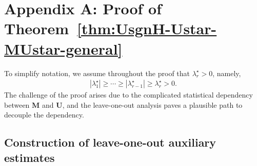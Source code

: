 
















\section{Appendix A: Proof of Theorem~\ref{thm:UsgnH-Ustar-MUstar-general}}
\label{sec:proof-thm:UsgnH-Ustar-MUstar-general}

To simplify notation, we assume throughout the proof that $\lambda_r^{\star} > 0$, namely,
%
\begin{align}
	|\lambda_1^{\star}| \geq  \cdots \geq | \lambda_{r-1}^{\star} | \geq \lambda_r^{\star} > 0.
	\label{eq:assumption-lambda-r-positive}
\end{align}
The challenge of the proof arises due to the complicated statistical dependency between $\bm{M}$ and $\bm{U}$, and the leave-one-out analysis paves a plausible path to decouple the dependency.






\subsection{Construction of leave-one-out auxiliary estimates}
\label{sec:construction-LOO-general}

